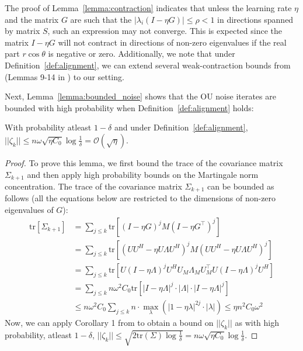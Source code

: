 The proof of Lemma~\ref{lemma:contraction} indicates that unless the learning rate $\eta$ and the matrix $G$ are such that the $|\lambda_i(I - \eta G)| \leq \rho < 1$ in directions spanned by matrix $S$, such an expression may not converge. This is expected since the matrix $I - \eta G$  will not contract in directions of non-zero eigenvalues if the real part $r \cos \theta$ is negative or zero. Additionally, we note that under Definition~\ref{def:alignment}, we can extend several weak-contraction bounds from \citet{damian2021label} (Lemmas 9-14 in \citet{damian2021label}) to our setting. 

Next, Lemma~\ref{lemma:bounded_noise} shows that the OU noise iterates are bounded with high probability when Definition~\ref{def:alignment} holds:
\begin{lemma}
\label{lemma:bounded_noise}
With probability atleast $1 - \delta$ and under Definition~\ref{def:alignment}, $||\zeta_k|| \leq n \omega \sqrt{\eta C_0} \log \frac{1}{\delta} = \mathcal{O}(\sqrt{\eta})$. 
\end{lemma}
\begin{proof}
To prove this lemma, we first bound the trace of the covariance matrix $\Sigma_{k+1}$ and then apply high probability bounds on the Martingale norm concentration. The trace of the covariance matrix $\Sigma_{k+1}$ can be bounded as follows (all the equations below are restricted to the dimensions of non-zero eigenvalues of $G$):
\begin{align}
    \mathrm{tr}\left[\Sigma_{k+1} \right] &= \sum_{j \leq k} \mathrm{tr}\left[(I - \eta G)^j M (I - \eta G^\top)^j \right]\\
    &= \sum_{j \leq k} \mathrm{tr}\left[ (U U^H - \eta U \Lambda U^H)^j M (U U^H - \eta U \Lambda U^H)^j \right]\\
    &= \sum_{j \leq k} \mathrm{tr}\left[ U (I - \eta \Lambda)^j U^H U_M \Lambda_M U_M^\top U (I - \eta \Lambda)^j U^H \right]\\
    &= \sum_{j \leq k} n \omega^2 C_0 \mathrm{tr}\left[ |I - \eta \Lambda|^j \cdot |\Lambda| \cdot |I - \eta \Lambda|^j \right]\\
    &\leq n \omega^2 C_0 \sum_{j \leq k} n \cdot \max_\lambda (|1 - \eta \lambda|^{2j} \cdot  |\lambda|) \leq {\eta n^2 C_0 \omega^2}
\end{align}
Now, we can apply Corollary 1 from \citet{damian2021label} to obtain a bound on $||\zeta_k||$ as with high probability, atleast $1 - \delta$, $||\zeta_k|| \leq \sqrt{2 \mathrm{tr}(\Sigma) \log \frac{1}{\delta}} = n \omega \sqrt{\eta C_0} \log \frac{1}{\delta}$.
\end{proof}

